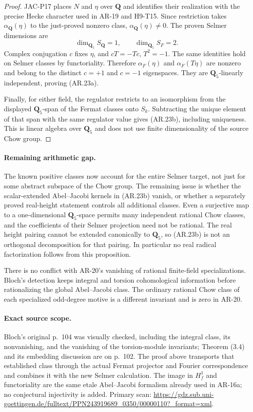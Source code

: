 \documentclass[11pt,a4paper]{article}
\begin{document}
\begin{proof}
JAC-P17 places $N$ and $\eta$ over $\mathbf Q$ and identifies their
realization with the precise Hecke character used in AR-19 and
H9-T15.  Since restriction takes
$\alpha_{\mathbf Q}(\eta)$ to the just-proved nonzero class,
$\alpha_{\mathbf Q}(\eta)\ne0$.  The proven Selmer dimensions are
\[
 \dim_{\mathbf Q_5}S_{\mathbf Q}=1,\qquad
 \dim_{\mathbf Q_5}S_F=2.
\]
Complex conjugation $c$ fixes $\eta$, and $cT=-Tc$, $T^2=-1$.
The same identities hold on Selmer classes by functoriality.
Therefore $\alpha_F(\eta)$ and $\alpha_F(T\eta)$ are nonzero and
belong to the distinct $c=+1$ and $c=-1$ eigenspaces.  They are
$\mathbf Q_5$-linearly independent, proving (AR.23a).

Finally, for either field, the regulator restricts to an isomorphism
from the displayed $\mathbf Q_5$-span of the Fermat classes onto
$S_k$.  Subtracting the unique element of that span with the same
regulator value gives (AR.23b), including uniqueness.  This is
linear algebra over $\mathbf Q_5$ and does not use finite
dimensionality of the source Chow group.
\end{proof}

\paragraph{Remaining arithmetic gap.}
The known positive classes now account for the entire Selmer target,
not just for some abstract subspace of the Chow group.  The remaining
issue is whether the scalar-extended Abel--Jacobi kernels in
(AR.23b) vanish, or whether a separately proved real-height statement
controls all additional classes.  Even a surjective map to a
one-dimensional $\mathbf Q_5$-space permits many independent rational
Chow classes, and the coefficients of their Selmer projection need
not be rational.  The real height pairing cannot be extended
canonically to $\mathbf Q_5$, so (AR.23b) is not an orthogonal
decomposition for that pairing.  In particular no real radical
factorization follows from this proposition.

There is no conflict with AR-20's vanishing of rational finite-field
specializations.  Bloch's detection keeps integral and torsion
cohomological information before rationalizing the global
Abel--Jacobi class.  The ordinary rational Chow class of each
specialized odd-degree motive is a different invariant and is zero
in AR-20.

\paragraph{Exact source scope.}
Bloch's original p.~104 was visually checked, including the integral
class, its nonvanishing, and the vanishing of the torsion-module
invariants; Theorem (3.4) and its embedding discussion are on p.~102.
The proof above transports that established class through the actual
Fermat projector and Fourier correspondence and combines it with the
new Selmer calculation.  The image in $H^1_f$ and functoriality are
the same etale Abel--Jacobi formalism already used in AR-16a; no
conjectural injectivity is added.  Primary scan:
\url{https://gdz.sub.uni-goettingen.de/fulltext/PPN243919689_0350/00000110?_format=xml}.
\end{document}
